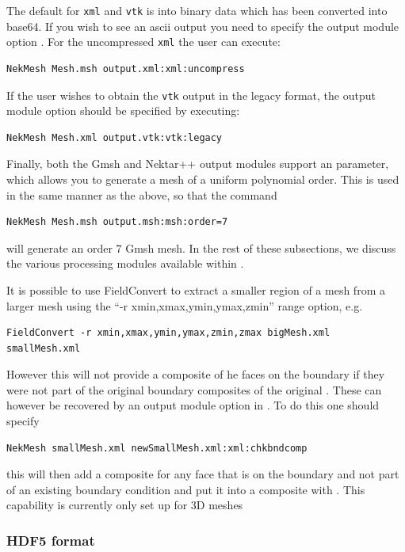 The default for \texttt{xml} and \texttt{vtk} is into binary data which has been
converted into base64. If you wish to see an ascii output you need to
specify the output module option . For the uncompressed 
\texttt{xml} the user can execute:
%
\begin{lstlisting}[style=BashInputStyle]
NekMesh Mesh.msh output.xml:xml:uncompress
\end{lstlisting}
%
If the user wishes to obtain the \texttt{vtk} output in the legacy format,
the output module option  should be specified by executing:
%
\begin{lstlisting}[style=BashInputStyle]
NekMesh Mesh.xml output.vtk:vtk:legacy
\end{lstlisting}
%
Finally, both the Gmsh and Nektar++ output modules support an 
parameter, which allows you to generate a mesh of a uniform polynomial
order. This is used in the same manner as the above, so that the command
%
\begin{lstlisting}[style=BashInputStyle]
NekMesh Mesh.msh output.msh:msh:order=7
\end{lstlisting}
%
will generate an order 7 Gmsh mesh. In the rest of these subsections, we discuss
the various processing modules available within \nm.


It is possible to use FieldConvert to extract a smaller region of a mesh
from a larger mesh using the ``-r xmin,xmax,ymin,ymax,zmin'' range
option, e.g.
\begin{lstlisting}[style=BashInputStyle]
FieldConvert -r xmin,xmax,ymin,ymax,zmin,zmax bigMesh.xml smallMesh.xml
\end{lstlisting}
However this will not provide a composite of he faces on the
boundary if they were not part of the original boundary composites of
the original . These can however be recovered by an
output module option  in \nm. To do this one should
specify
\begin{lstlisting}[style=BashInputStyle]
NekMesh smallMesh.xml newSmallMesh.xml:xml:chkbndcomp 
\end{lstlisting}
this will then add a composite for any face that is on the boundary
and not part of an existing boundary condition and put it into a
composite with . This capability is currently only set up for 3D meshes

\subsubsection{HDF5 format}

